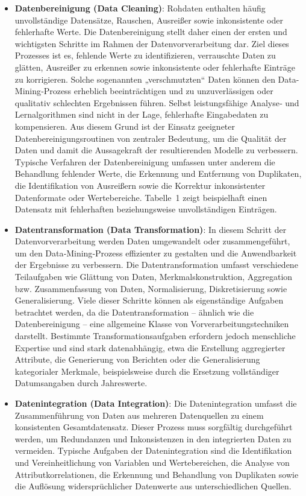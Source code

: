 \begin{itemize}
	\item \textbf{Datenbereinigung (Data Cleaning)}:  
	Rohdaten enthalten häufig unvollständige Datensätze, Rauschen, Ausreißer sowie inkonsistente oder fehlerhafte Werte. Die Datenbereinigung stellt daher einen der ersten und wichtigsten Schritte im Rahmen der Datenvorverarbeitung dar. Ziel dieses Prozesses ist es, fehlende Werte zu identifizieren, verrauschte Daten zu glätten, Ausreißer zu erkennen sowie inkonsistente oder fehlerhafte Einträge zu korrigieren.
	Solche sogenannten „verschmutzten“ Daten können den Data-Mining‑Prozess erheblich beeinträchtigen und zu unzuverlässigen oder qualitativ schlechten Ergebnissen führen. Selbst leistungsfähige Analyse‑ und Lernalgorithmen sind nicht in der Lage, fehlerhafte Eingabedaten zu kompensieren. Aus diesem Grund ist der Einsatz geeigneter Datenbereinigungsroutinen von zentraler Bedeutung, um die Qualität der Daten und damit die Aussagekraft der resultierenden Modelle zu verbessern.
	Typische Verfahren der Datenbereinigung umfassen unter anderem die Behandlung fehlender Werte, die Erkennung und Entfernung von Duplikaten, die Identifikation von Ausreißern sowie die Korrektur inkonsistenter Datenformate oder Wertebereiche. Tabelle~1 zeigt beispielhaft einen Datensatz mit fehlerhaften beziehungsweise unvollständigen Einträgen. \cite{pyle1999data}
	
	\item \textbf{Datentransformation (Data Transformation)}:  
	In diesem Schritt der Datenvorverarbeitung werden Daten umgewandelt oder zusammengeführt, um den Data‑Mining‑Prozess effizienter zu gestalten und die Anwendbarkeit der Ergebnisse zu verbessern. Die Datentransformation umfasst verschiedene Teilaufgaben wie Glättung von Daten, Merkmalskonstruktion, Aggregation bzw. Zusammenfassung von Daten, Normalisierung, Diskretisierung sowie Generalisierung.
	Viele dieser Schritte können als eigenständige Aufgaben betrachtet werden, da die Datentransformation – ähnlich wie die Datenbereinigung – eine allgemeine Klasse von Vorverarbeitungstechniken darstellt. Bestimmte Transformationsaufgaben erfordern jedoch menschliche Expertise und sind stark datenabhängig, etwa die Erstellung aggregierter Attribute, die Generierung von Berichten oder die Generalisierung kategorialer Merkmale, beispielsweise durch die Ersetzung vollständiger Datumsangaben durch Jahreswerte. \cite{baskar2013systemwebatic}
	
	\item \textbf{Datenintegration (Data Integration)}:  
	Die Datenintegration umfasst die Zusammenführung von Daten aus mehreren Datenquellen zu einem konsistenten Gesamtdatensatz. Dieser Prozess muss sorgfältig durchgeführt werden, um Redundanzen und Inkonsistenzen in den integrierten Daten zu vermeiden.
	Typische Aufgaben der Datenintegration sind die Identifikation und Vereinheitlichung von Variablen und Wertebereichen, die Analyse von Attributkorrelationen, die Erkennung und Behandlung von Duplikaten sowie die Auflösung widersprüchlicher Datenwerte aus unterschiedlichen Quellen. \cite{witten2005practical}
	

\end{itemize}
